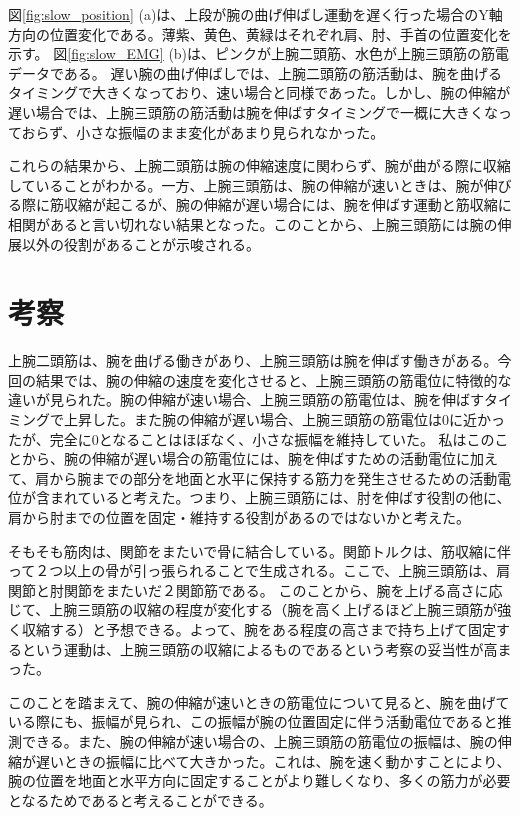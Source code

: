 \documentclass{jsarticle}
\begin{document}
図\ref{fig:slow_position} (a)は、上段が腕の曲げ伸ばし運動を遅く行った場合のY軸方向の位置変化である。薄紫、黄色、黄緑はそれぞれ肩、肘、手首の位置変化を示す。
図\ref{fig:slow_EMG} (b)は、ピンクが上腕二頭筋、水色が上腕三頭筋の筋電データである。
遅い腕の曲げ伸ばしでは、上腕二頭筋の筋活動は、腕を曲げるタイミングで大きくなっており、速い場合と同様であった。しかし、腕の伸縮が遅い場合では、上腕三頭筋の筋活動は腕を伸ばすタイミングで一概に大きくなっておらず、小さな振幅のまま変化があまり見られなかった。

これらの結果から、上腕二頭筋は腕の伸縮速度に関わらず、腕が曲がる際に収縮していることがわかる。一方、上腕三頭筋は、腕の伸縮が速いときは、腕が伸びる際に筋収縮が起こるが、腕の伸縮が遅い場合には、腕を伸ばす運動と筋収縮に相関があると言い切れない結果となった。このことから、上腕三頭筋には腕の伸展以外の役割があることが示唆される。

\section{考察}

上腕二頭筋は、腕を曲げる働きがあり、上腕三頭筋は腕を伸ばす働きがある\cite{reference1}。今回の結果では、腕の伸縮の速度を変化させると、上腕三頭筋の筋電位に特徴的な違いが見られた。腕の伸縮が速い場合、上腕三頭筋の筋電位は、腕を伸ばすタイミングで上昇した。また腕の伸縮が遅い場合、上腕三頭筋の筋電位は0に近かったが、完全に0となることはほぼなく、小さな振幅を維持していた。
私はこのことから、腕の伸縮が遅い場合の筋電位には、腕を伸ばすための活動電位に加えて、肩から腕までの部分を地面と水平に保持する筋力を発生させるための活動電位が含まれていると考えた。つまり、上腕三頭筋には、肘を伸ばす役割の他に、肩から肘までの位置を固定・維持する役割があるのではないかと考えた。

そもそも筋肉は、関節をまたいで骨に結合している。関節トルクは、筋収縮に伴って２つ以上の骨が引っ張られることで生成される。ここで、上腕三頭筋は、肩関節と肘関節をまたいだ２関節筋である\cite{reference2}。
このことから、腕を上げる高さに応じて、上腕三頭筋の収縮の程度が変化する（腕を高く上げるほど上腕三頭筋が強く収縮する）と予想できる。よって、腕をある程度の高さまで持ち上げて固定するという運動は、上腕三頭筋の収縮によるものであるという考察の妥当性が高まった。

このことを踏まえて、腕の伸縮が速いときの筋電位について見ると、腕を曲げている際にも、振幅が見られ、この振幅が腕の位置固定に伴う活動電位であると推測できる。また、腕の伸縮が速い場合の、上腕三頭筋の筋電位の振幅は、腕の伸縮が遅いときの振幅に比べて大きかった。これは、腕を速く動かすことにより、腕の位置を地面と水平方向に固定することがより難しくなり、多くの筋力が必要となるためであると考えることができる。
\end{document}
